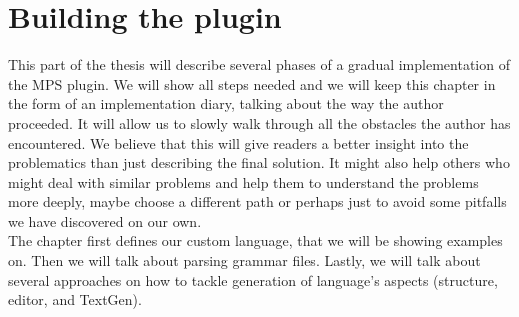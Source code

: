 \chapter{Building the plugin}
\label{chap:importing_the_grammar}

This part of the thesis will describe several phases of a gradual implementation of the MPS plugin.
We will show all steps needed and we will keep this chapter in the form of an implementation diary, talking about the way the author proceeded.
It will allow us to slowly walk through all the obstacles the author has encountered.
We believe that this will give readers a better insight into the problematics than just describing the final solution.
It might also help others who might deal with similar problems and help them to understand the problems more deeply, maybe choose a different path or perhaps just to avoid some pitfalls we have discovered on our own.
\\

The chapter first defines our custom language, that we will be showing examples on.
Then we will talk about parsing grammar files.
Lastly, we will talk about several approaches on how to tackle generation of language's aspects (structure, editor, and TextGen).



\pagebreak



\pagebreak



\pagebreak



\pagebreak



\pagebreak

